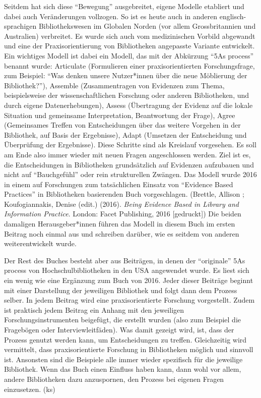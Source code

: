 \documentclass[a4paper,
fontsize=11pt,
oneside,
numbers=noperiodatend,
parskip=half-,
bibliography=totoc,
final
]{scrartcl}
\begin{document}
Seitdem hat sich diese \enquote{Bewegung} ausgebreitet, eigene Modelle
etabliert und dabei auch Veränderungen vollzogen. So ist es heute auch
in anderen englisch-sprachigen Bibliothekswesen im Globalen Norden (vor
allem Grossbritannien und Australien) verbreitet. Es wurde sich auch vom
medizinischen Vorbild abgewandt und eine der Praxisorientierung von
Bibliotheken angepasste Variante entwickelt. Ein wichtiges Modell ist
dabei ein Modell, das mit der Abkürzung \enquote{5As process} benannt
wurde: Articulate (Formulieren einer praxisorientierten Forschungsfrage,
zum Beispiel: \enquote{Was denken unsere Nutzer*innen über die neue
Möblierung der Bibliothek?}), Assemble (Zusammentragen von Evidenzen zum
Thema, beispielsweise der wissenschaftlichen Forschung oder anderen
Bibliotheken, und durch eigene Datenerhebungen), Assess (Übertragung der
Evidenz auf die lokale Situation und gemeinsame Interpretation,
Beantwortung der Frage), Agree (Gemeinsames Treffen von Entscheidungen
über das weitere Vorgehen in der Bibliothek, auf Basis der Ergebnisse),
Adapt (Umsetzen der Entscheidung und Überprüfung der Ergebnisse). Diese
Schritte sind als Kreislauf vorgesehen. Es soll am Ende also immer
wieder mit neuen Fragen angeschlossen werden. Ziel ist es, die
Entscheidungen in Bibliotheken grundsätzlich auf Evidenzen aufzubauen
und nicht auf \enquote{Bauchgefühl} oder rein strukturellen Zwängen. Das
Modell wurde 2016 in einem auf Forschungen zum tatsächlichen Einsatz von
\enquote{Evidence Based Practices} in Bibliotheken basierenden Buch
vorgeschlagen. (Brettle, Allison ; Koufogiannakis, Denise (edit.)
(2016). \emph{Being Evidence Based in Library and Information Practice}.
London: Facet Publishing, 2016 {[}gedruckt{]}) Die beiden damaligen
Herausgeber*innen führen das Modell in diesem Buch im ersten Beitrag
noch einmal aus und schreiben darüber, wie es seitdem von anderen
weiterentwickelt wurde.

Der Rest des Buches besteht aber aus Beiträgen, in denen der
\enquote{originale} 5As process von Hochschulbibliotheken in den USA
angewendet wurde. Es liest sich ein wenig wie eine Ergänzung zum Buch
von 2016. Jeder dieser Beiträge beginnt mit einer Darstellung der
jeweiligen Bibliothek und folgt dann dem Prozess selber. In jedem
Beitrag wird eine praxisorientierte Forschung vorgestellt. Zudem ist
praktisch jedem Beitrag ein Anhang mit den jeweiligen
Forschungsinstrumenten beigefügt, die erstellt wurden (also zum Beispiel
die Fragebögen oder Interviewleitfäden). Was damit gezeigt wird, ist,
dass der Prozess genutzt werden kann, um Entscheidungen zu treffen.
Gleichzeitig wird vermittelt, dass praxisorientierte Forschung in
Bibliotheken möglich und sinnvoll ist. Ansonsten sind die Beispiele alle
immer wieder spezifisch für die jeweilige Bibliothek. Wenn das Buch
einen Einfluss haben kann, dann wohl vor allem, andere Bibliotheken dazu
anzuspornen, den Prozess bei eigenen Fragen einzusetzen. (ks)
\end{document}
